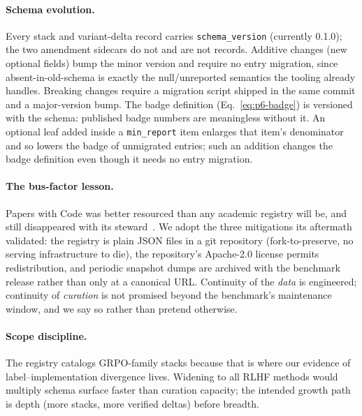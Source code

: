 \paragraph{Schema evolution.}
Every stack and variant-delta record carries \texttt{schema_version}
(currently 0.1.0); the two amendment sidecars do not and are not records. Additive
changes (new optional fields) bump the minor version and require no entry
migration, since absent-in-old-schema is exactly the null/unreported semantics
the tooling already handles. Breaking changes require a migration script
shipped in the same commit and a major-version bump. The badge definition
(Eq.~\ref{eq:p6-badge}) is versioned with the schema: published badge numbers
are meaningless without it. An optional leaf added inside a
\texttt{min_report} item enlarges that item's denominator and so lowers the
badge of unmigrated entries; such an addition changes the badge definition
even though it needs no entry migration.

\paragraph{The bus-factor lesson.}
Papers with Code was better resourced than any academic registry will be, and
still disappeared with its steward~\citep{paperswithcode2025}. We adopt the
three mitigations its aftermath validated: the registry is plain JSON files in
a git repository (fork-to-preserve, no serving infrastructure to die), the
repository's Apache-2.0 license permits redistribution, and periodic snapshot dumps are archived with
the benchmark release rather than only at a canonical URL. Continuity of the
\emph{data} is engineered; continuity of \emph{curation} is not promised
beyond the benchmark's maintenance window, and we say so rather than pretend
otherwise.

\paragraph{Scope discipline.}
The registry catalogs GRPO-family stacks because that is where our evidence
of label--implementation divergence lives. Widening to all RLHF methods would
multiply schema surface faster than curation capacity; the intended growth
path is depth (more stacks, more verified deltas) before breadth.
